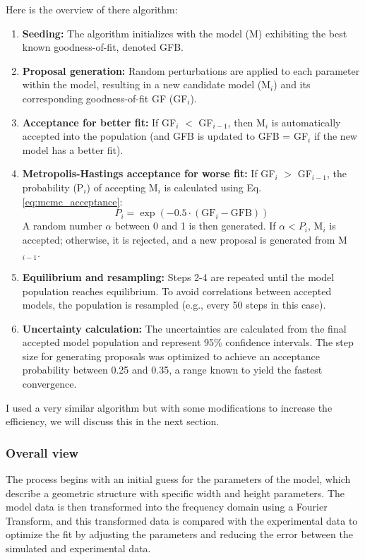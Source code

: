 Here is the overview of there algorithm:

\begin{enumerate}
    \item \textbf{Seeding:} The algorithm initializes with the model (M) exhibiting the best known goodness-of-fit, denoted GFB.
    \item \textbf{Proposal generation:} Random perturbations are applied to each parameter within the model, resulting in a new candidate model (M$_i$) and its corresponding goodness-of-fit GF (GF$_i$).
    \item \textbf{Acceptance for better fit:} If GF$_i$ $<$ GF$_{i-1}$, then M$_i$ is automatically accepted into the population (and GFB is updated to GFB = GF$_i$ if the new model has a better fit).
    \item \textbf{Metropolis-Hastings acceptance for worse fit:} If GF$_i$ $>$ GF$_{i-1}$, the probability (P$_i$) of accepting M$_i$ is calculated using Eq. \eqref{eq:mcmc_acceptance}:
    \begin{equation}
        P_i = \exp \left( -0.5 \cdot (\text{GF}_i - \text{GFB}) \right) \label{eq:mcmc_acceptance}
    \end{equation}
    A random number $\alpha$ between 0 and 1 is then generated. If $\alpha < P_i$, M$_i$ is accepted; otherwise, it is rejected, and a new proposal is generated from M$_{i-1}$.
    \item \textbf{Equilibrium and resampling:} Steps 2-4 are repeated until the model population reaches equilibrium. To avoid correlations between accepted models, the population is resampled (e.g., every 50 steps in this case).
    \item \textbf{Uncertainty calculation:} The uncertainties are calculated from the final accepted model population and represent 95\% confidence intervals. The step size for generating proposals was optimized to achieve an
     acceptance probability between 0.25 and 0.35, a range known to yield the fastest convergence.
\end{enumerate}

I used a very similar algorithm but with some modifications to increase the efficiency, we will discuss this in the next section.

\subsubsection{Overall view}

\medskip

The process begins with an initial guess for the parameters of the model, which describe a geometric structure with specific width and height parameters. The model data is then transformed into the frequency domain using a Fourier Transform, and this transformed data is compared with the experimental data to optimize the fit by adjusting the parameters and reducing the error between the simulated and experimental data.


